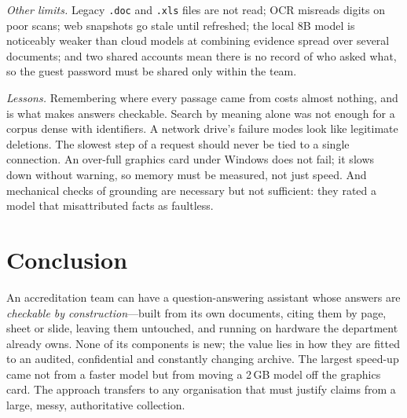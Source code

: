 \documentclass[conference]{IEEEtran}
\begin{document}
\emph{Other limits.} Legacy \texttt{.doc} and \texttt{.xls} files are not read;
OCR misreads digits on poor scans; web snapshots go stale until refreshed; the
local 8B model is noticeably weaker than cloud models at combining evidence
spread over several documents; and two shared accounts mean there is no record
of who asked what, so the guest password must be shared only within the team.

\emph{Lessons.} Remembering where every passage came from costs almost nothing,
and is what makes answers checkable. Search by meaning alone was not enough for
a corpus dense with identifiers. A network drive's failure modes look like
legitimate deletions. The slowest step of a request should never be tied to a
single connection. An over-full graphics card under Windows does not fail; it
slows down without warning, so memory must be measured, not just speed. And
mechanical checks of grounding are necessary but not sufficient: they rated a
model that misattributed facts as faultless.

\section{Conclusion}

An accreditation team can have a question-answering assistant whose answers are
\emph{checkable by construction}---built from its own documents, citing them by
page, sheet or slide, leaving them untouched, and running on hardware the
department already owns. None of its components is new; the value lies in how
they are fitted to an audited, confidential and constantly changing archive.
The largest speed-up came not from a faster model but from moving a 2\,GB
model off the graphics card. The approach transfers to any organisation that
must justify claims from a large, messy, authoritative collection.
\end{document}
